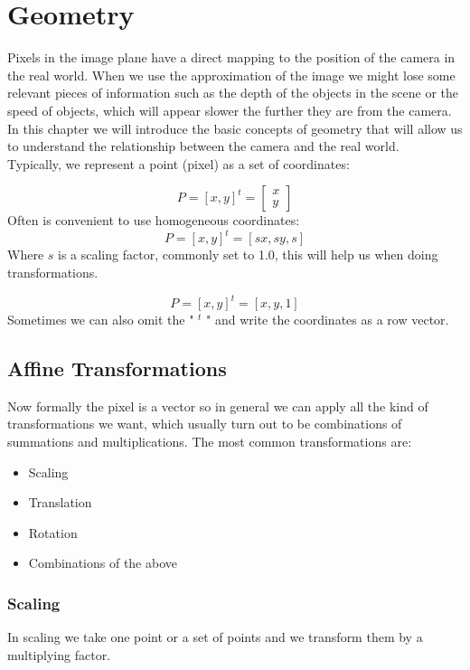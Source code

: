 \chapter{Geometry}

Pixels in the image plane have a direct mapping to the position of the camera in the real world. When we use the approximation of the image we might lose some relevant pieces of information such as the depth of the objects in the scene or the speed of objects, which will appear slower the further they are from the camera. 
\\
In this chapter we will introduce the basic concepts of geometry that will allow us to understand the relationship between the camera and the real world.
\\
Typically, we represent a point (pixel) as a set of coordinates:

\[ P = [ x, y ]^t = \begin{bmatrix} x \\ y \end{bmatrix}\]
Often is convenient to use homogeneous coordinates:
\[ P = [ x, y ]^t = [sx, sy, s]\]
Where \( s \) is a scaling factor, commonly set to 1.0, this will help us when doing transformations.

\[ P = [ x, y ]^t = [x, y, 1]\]
Sometimes we can also omit the " \(^t\) " and write the coordinates as a row vector.

\section{Affine Transformations}

Now formally the pixel is a vector so in general we can apply all the kind of transformations we want, which usually turn out to be combinations of summations and multiplications. 
The most common transformations are:

\begin{itemize} 
    \item Scaling 
    \item Translation 
    \item Rotation 
    \item Combinations of the above 
\end{itemize}

\subsection{Scaling}

In scaling we take one point or a set of points and we transform them by a multiplying factor. 

